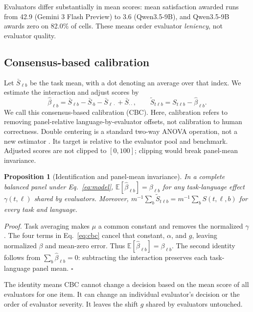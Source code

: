 \documentclass[sigconf,anonymous]{aamas}
\newtheorem{proposition}{Proposition}
\begin{document}
Evaluators differ substantially in mean scores: mean satisfaction awarded runs from
42.9 (Gemini 3 Flash Preview) to 3.6 (Qwen3.5-9B), and Qwen3.5-9B
awards zero on 82.0\% of cells.
These means order evaluator \emph{leniency}, not evaluator quality.

\subsection{Consensus-based calibration}
Let $\bar S_{\ell b}$ be the task mean, with a dot denoting an average
over that index. We estimate the interaction and adjust scores by
\begin{equation}
\hat\beta_{\ell b}=\bar S_{\ell b}-\bar S_{\cdot b}
-\bar S_{\ell\cdot}+\bar S_{\cdot\cdot},
\qquad
\widetilde S_{t\ell b}=S_{t\ell b}-\hat\beta_{\ell b}.
\label{eq:cbc}
\end{equation}
We call this consensus-based calibration (CBC). Here, calibration
refers to removing panel-relative language-by-evaluator offsets, not
calibration to human correctness. Double centering is a
standard two-way ANOVA operation, not a new estimator
\citep{scheffe1959analysis,searle1971linear}. Its target is relative to
the evaluator pool and benchmark. Adjusted scores are not clipped to
$[0,100]$; clipping would break panel-mean invariance.

\begin{proposition}[Identification and panel-mean invariance]
\label{prop:identify}
In a complete balanced panel under Eq.~\ref{eq:model},
$\mathbb E[\hat\beta_{\ell b}]=\beta_{\ell b}$ for any
task-language effect $\gamma(t,\ell)$ shared by evaluators. Moreover,
$m^{-1}\sum_b\widetilde S_{t\ell b}
=m^{-1}\sum_b S(t,\ell,b)$ for every task and language.
\end{proposition}
\noindent\emph{Proof.} 
Task averaging makes $\mu$ a common constant and removes the normalized
$\gamma$. The four terms in Eq.~\ref{eq:cbc} cancel that constant,
$\alpha$, and $g$, leaving normalized $\beta$ and mean-zero error.
Thus $\mathbb E[\hat\beta_{\ell b}]=\beta_{\ell b}$.
The second identity follows from $\sum_b\hat\beta_{\ell b}=0$:
subtracting the interaction preserves each task-language panel mean.
\hfill$\square$

The identity means CBC cannot change a decision based on the mean score
of all evaluators for one item. It can change an individual evaluator's
decision or the order of evaluator severity. It leaves the shift $g$
shared by evaluators untouched.
\end{document}
